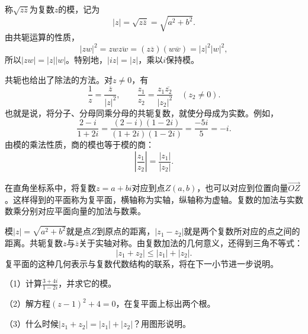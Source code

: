 称\(\sqrt{z \overline{z}}\)为复数\(z\)的{\heiti{}模}，记为
\begin{equation}
    \left| z \right| = \sqrt{z \overline{z}} = \sqrt{a^{2} + b^{2}} .
\end{equation}
由共轭运算的性质，
\begin{equation}
    \left| z w \right|^{2} = z w \overline{z w}
    = \left( z \overline{z} \right) \left( w \overline{w} \right)
    = \left| z \right|^{2} \left| w \right|^{2} ,
\end{equation}
所以\(\left| z w \right| = \left| z \right| \left| w \right|\)。特别地，\(\left| i z \right| = \left| z \right|\)，乘以\(i\)保持模。

共轭也给出了除法的方法。对\(z \ne 0\)，有
\begin{equation}
    \frac{1}{z} = \frac{\overline{z}}{\left| z \right|^{2}} , \qquad
    \frac{z_{1}}{z_{2}} = \frac{z_{1} \overline{z_{2}}}{\left| z_{2} \right|^{2}} \quad \left( z_{2} \ne 0 \right) .
\end{equation}
也就是说，将分子、分母同乘分母的共轭复数，就使分母成为实数。例如，
\begin{equation}
    \frac{2 - i}{1 + 2 i}
    = \frac{\left( 2 - i \right) \left( 1 - 2 i \right)}{\left( 1 + 2 i \right) \left( 1 - 2 i \right)}
    = \frac{- 5 i}{5} = - i .
\end{equation}
由模的乘法性质，商的模也等于模的商：
\begin{equation}
    \left| \frac{z_{1}}{z_{2}} \right| = \frac{\left| z_{1} \right|}{\left| z_{2} \right|} .
\end{equation}

在直角坐标系中，将复数\(z = a + b i\)对应到点\(Z \left( a , b \right)\)，也可以对应到位置向量\(\vec{O Z}\)。这样得到的平面称为{\heiti{}复平面}，横轴称为实轴，纵轴称为虚轴。复数的加法与实数数乘分别对应平面向量的加法与数乘。

模\(\left| z \right| = \sqrt{a^{2} + b^{2}}\)就是点\(Z\)到原点的距离，\(\left| z_{1} - z_{2} \right|\)就是两个复数所对应的点之间的距离。共轭复数\(z\)与\(\overline{z}\)关于实轴对称。由复数加法的几何意义，还得到三角不等式：
\begin{equation}
    \left| z_{1} + z_{2} \right| \le \left| z_{1} \right| + \left| z_{2} \right| .
\end{equation}
复平面的这种几何表示与复数代数结构的联系，将在下一小节进一步说明。

\begin{samepage}
\begin{example}
（1）计算\(\frac{3 + 4 i}{1 - 2 i}\)，并求它的模。
\par\nopagebreak[4]

（2）解方程\(\left( z - 1 \right)^{2} + 4 = 0\)，在复平面上标出两个根。
\par\nopagebreak[4]

（3）什么时候\(\left| z_{1} + z_{2} \right| = \left| z_{1} \right| + \left| z_{2} \right|\)？用图形说明。
\end{example}
\par
\end{samepage}

